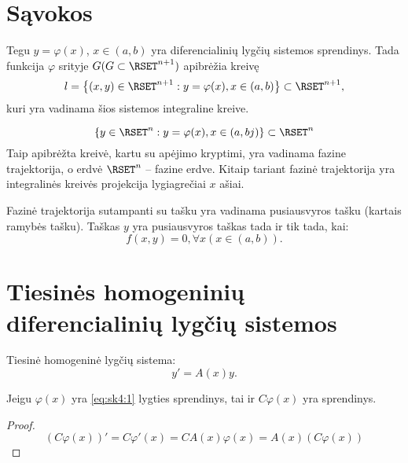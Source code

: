 
\section{Sąvokos}

\cite[109]{konspektas}

\begin{defn}
  Tegu $y = \varphi(x)$, $x \in (a, b)$ yra diferencialinių lygčių
  sistemos sprendinys. Tada funkcija $\varphi$ srityje
  $G (G \subset \RSET^{n+1})$ apibrėžia kreivę
  \begin{equation*}
    l = \left\{ (x, y) \in \RSET^{n+1} :%
      y = \varphi(x), x \in (a, b) \right\} \subset \RSET^{n+1},
  \end{equation*}
  kuri yra vadinama šios sistemos integraline kreive.
\end{defn}

\begin{defn}
  \begin{equation*}
    \left\{ y \in \RSET^{n} : y = \varphi(x), x \in (a, bj) \right\}%
      \subset \RSET^{n}
  \end{equation*}
  Taip apibrėžta kreivė, kartu su apėjimo kryptimi, yra vadinama
  fazine trajektorija, o erdvė $\RSET^{n}$ – fazine erdve.
  Kitaip tariant fazinė trajektorija yra integralinės kreivės
  projekcija lygiagrečiai $x$ ašiai.
\end{defn}

\begin{defn}
  Fazinė trajektorija sutampanti su tašku yra vadinama pusiausvyros
  tašku (kartais ramybės tašku). Taškas $y$ yra pusiausvyros
  taškas tada ir tik tada, kai:
  \begin{equation*}
    f(x, y) = 0, \forall x (x \in (a, b)).
  \end{equation*}
\end{defn}

\section{Tiesinės homogeninių diferencialinių lygčių sistemos}

Tiesinė homogeninė lygčių sistema:
\begin{equation}
  y' = A(x) y.
  \label{eq:sk4:1}
\end{equation}

\begin{prop}
  Jeigu $\varphi(x)$ yra \ref{eq:sk4:1} lygties sprendinys, tai ir
  $C\varphi(x)$ yra sprendinys.
  \begin{proof}
    \begin{equation*}
      (C\varphi(x))' = C\varphi'(x) = CA(x)\varphi(x) = A(x)(C\varphi(x))
    \end{equation*}
  \end{proof}
\end{prop}

